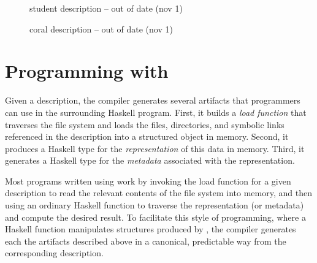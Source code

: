 \documentclass[nocopyrightspace,natbib]{sigplanconf}
\begin{document}
\begin{figure}

\caption{\forest{} student description -- out of date (nov 1)}
\label{fig:student-description}
\end{figure}

\begin{figure}

\caption{\forest{} coral description -- out of date (nov 1)}
\label{fig:coral-description}
\end{figure}

\section{Programming with \forest{}}
\label{sec:exp}


Given a description, the \forest{} compiler generates several
artifacts that programmers can use in the surrounding Haskell
program. First, it builds a \emph{load function} that traverses the
file system and loads the files, directories, and symbolic links
referenced in the description into a structured object in
memory. Second, it produces a Haskell type for the
\emph{representation} of this data in memory. Third, it generates a
Haskell type for the \emph{metadata} associated with the
representation.

Most programs written using \forest{} work by invoking the load
function for a given description to read the relevant contents of the
file system into memory, and then using an ordinary Haskell function
to traverse the representation (or metadata) and compute the desired
result. To facilitate this style of programming, where a Haskell
function manipulates structures produced by \forest{}, the compiler
generates each the artifacts described above in a canonical,
predictable way from the corresponding description.
\end{document}
